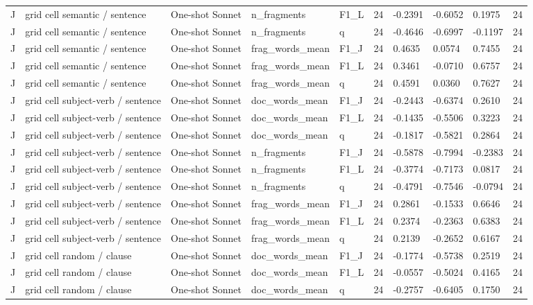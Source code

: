 \begin{table}[t]
{\begin{tabular}{llllllllll}
J & grid cell semantic / sentence & One-shot Sonnet & n\_fragments & F1\_L & 24 & -0.2391 & -0.6052 & 0.1975 & 24 \\
J & grid cell semantic / sentence & One-shot Sonnet & n\_fragments & q & 24 & -0.4646 & -0.6997 & -0.1197 & 24 \\
J & grid cell semantic / sentence & One-shot Sonnet & frag\_words\_mean & F1\_J & 24 & 0.4635 & 0.0574 & 0.7455 & 24 \\
J & grid cell semantic / sentence & One-shot Sonnet & frag\_words\_mean & F1\_L & 24 & 0.3461 & -0.0710 & 0.6757 & 24 \\
J & grid cell semantic / sentence & One-shot Sonnet & frag\_words\_mean & q & 24 & 0.4591 & 0.0360 & 0.7627 & 24 \\
J & grid cell subject-verb / sentence & One-shot Sonnet & doc\_words\_mean & F1\_J & 24 & -0.2443 & -0.6374 & 0.2610 & 24 \\
J & grid cell subject-verb / sentence & One-shot Sonnet & doc\_words\_mean & F1\_L & 24 & -0.1435 & -0.5506 & 0.3223 & 24 \\
J & grid cell subject-verb / sentence & One-shot Sonnet & doc\_words\_mean & q & 24 & -0.1817 & -0.5821 & 0.2864 & 24 \\
J & grid cell subject-verb / sentence & One-shot Sonnet & n\_fragments & F1\_J & 24 & -0.5878 & -0.7994 & -0.2383 & 24 \\
J & grid cell subject-verb / sentence & One-shot Sonnet & n\_fragments & F1\_L & 24 & -0.3774 & -0.7173 & 0.0817 & 24 \\
J & grid cell subject-verb / sentence & One-shot Sonnet & n\_fragments & q & 24 & -0.4791 & -0.7546 & -0.0794 & 24 \\
J & grid cell subject-verb / sentence & One-shot Sonnet & frag\_words\_mean & F1\_J & 24 & 0.2861 & -0.1533 & 0.6646 & 24 \\
J & grid cell subject-verb / sentence & One-shot Sonnet & frag\_words\_mean & F1\_L & 24 & 0.2374 & -0.2363 & 0.6383 & 24 \\
J & grid cell subject-verb / sentence & One-shot Sonnet & frag\_words\_mean & q & 24 & 0.2139 & -0.2652 & 0.6167 & 24 \\
J & grid cell random / clause & One-shot Sonnet & doc\_words\_mean & F1\_J & 24 & -0.1774 & -0.5738 & 0.2519 & 24 \\
J & grid cell random / clause & One-shot Sonnet & doc\_words\_mean & F1\_L & 24 & -0.0557 & -0.5024 & 0.4165 & 24 \\
J & grid cell random / clause & One-shot Sonnet & doc\_words\_mean & q & 24 & -0.2757 & -0.6405 & 0.1750 & 24 \\

\end{tabular}}
\end{table}
